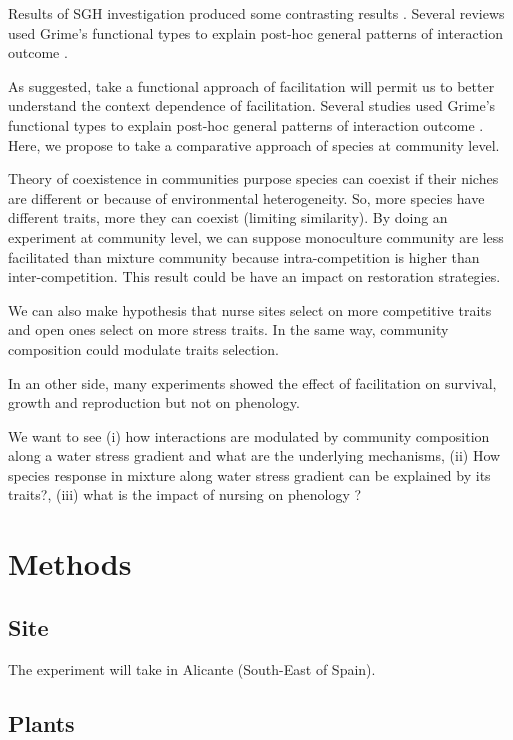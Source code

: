 \documentclass[12pt]{article} %
\begin{document}
Results of SGH investigation produced some contrasting results \citep{Maestre2009}. %
Several reviews used Grime's functional types to explain post-hoc general patterns of interaction outcome \citep{Maestre2009,Butterfield2013}.

As \citet{Butterfield2013} suggested, take a functional approach of facilitation will permit us to better understand the context dependence of facilitation. Several studies used Grime's functional types to explain post-hoc general patterns of interaction outcome \citep{Maestre2009,Butterfield2013}. Here, we propose to take a comparative approach of species at community level.

Theory of coexistence in communities purpose species can coexist if their niches are different or because of environmental heterogeneity. So, more species have different traits, more they can coexist (limiting similarity). By doing an experiment at community level, we can suppose monoculture community are less facilitated than mixture community because intra-competition is higher than inter-competition. This result could be have an impact on restoration strategies.

We can also make hypothesis that nurse sites select on more competitive traits and open ones select on more stress traits. In the same way, community composition could modulate traits selection.

In an other side, many experiments showed the effect of facilitation on survival, growth and reproduction but not on phenology. 

We want to see (i) how interactions are modulated by community composition along a water stress gradient and what are the underlying mechanisms, (ii) How species response in mixture along water stress gradient can be explained by its traits?, (iii) what is the impact of nursing on phenology ?



\section{Methods}

\subsection{Site}

The experiment will take in Alicante (South-East of Spain).
\subsection{Plants}
\end{document}
